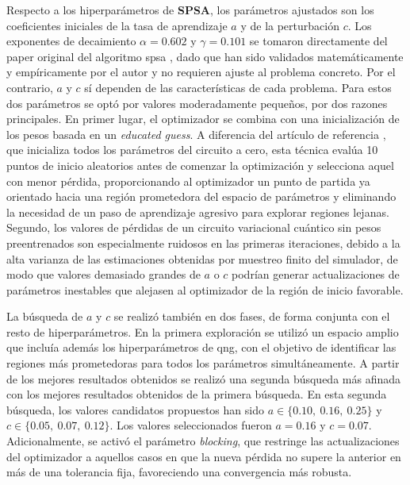 Respecto a los hiperparámetros de \textbf{SPSA}, los parámetros ajustados son los coeficientes iniciales de la tasa de aprendizaje $a$ y de la perturbación $c$. Los exponentes de decaimiento $\alpha = 0.602$ y $\gamma = 0.101$ se tomaron directamente del paper original del algoritmo \gls{spsa} \cite{spall_spsa_1998}, dado que han sido validados matemáticamente y empíricamente por el autor y no requieren ajuste al problema concreto. Por el contrario, $a$ y $c$ sí dependen de las características de cada problema. Para estos dos parámetros se optó por valores moderadamente pequeños, por dos razones principales. En primer lugar, el optimizador se combina con una inicialización de los pesos basada en un \textit{educated guess}. A diferencia del artículo de referencia \cite{ohno_qword2vec_2025}, que inicializa todos los parámetros del circuito a cero, esta técnica evalúa 10 puntos de inicio aleatorios antes de comenzar la optimización y selecciona aquel con menor pérdida, proporcionando al optimizador un punto de partida ya orientado hacia una región prometedora del espacio de parámetros y eliminando la necesidad de un paso de aprendizaje agresivo para explorar regiones lejanas. Segundo, los valores de pérdidas de un circuito variacional cuántico sin pesos preentrenados son especialmente ruidosos en las primeras iteraciones, debido a la alta varianza de las estimaciones obtenidas por muestreo finito del simulador, de modo que valores demasiado grandes de $a$ o $c$ podrían generar actualizaciones de parámetros inestables que alejasen al optimizador de la región de inicio favorable.

La búsqueda de $a$ y $c$ se realizó también en dos fases, de forma conjunta con el resto de hiperparámetros. En la primera exploración se utilizó un espacio amplio que incluía además los hiperparámetros de \gls{qng}, con el objetivo de identificar las regiones más prometedoras para todos los parámetros simultáneamente. A partir de los mejores resultados obtenidos se realizó una segunda búsqueda más afinada con los mejores resultados obtenidos de la primera búsqueda. En esta segunda búsqueda, los valores candidatos propuestos han sido $a \in \{0.10,\ 0.16,\ 0.25\}$ y $c \in \{0.05,\ 0.07,\ 0.12\}$. Los valores seleccionados fueron $a = 0.16$ y $c = 0.07$. Adicionalmente, se activó el parámetro \textit{blocking}, que restringe las actualizaciones del optimizador a aquellos casos en que la nueva pérdida no supere la anterior en más de una tolerancia fija, favoreciendo una convergencia más robusta.

